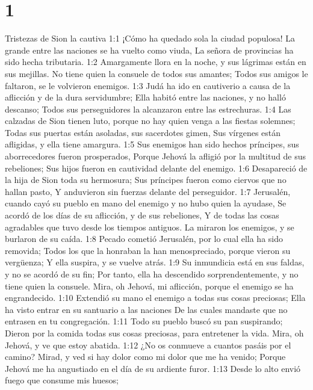 
\chapter{1}


Tristezas de Sion la cautiva  
1:1 ¡Cómo ha quedado sola la ciudad populosa!  
La grande entre las naciones se ha vuelto como viuda,  
La señora de provincias ha sido hecha tributaria.  
1:2 Amargamente llora en la noche, y sus lágrimas están en sus mejillas.  
No tiene quien la consuele de todos sus amantes;  
Todos sus amigos le faltaron, se le volvieron enemigos.  
1:3 Judá ha ido en cautiverio a causa de la aflicción y de la dura servidumbre;  
Ella habitó entre las naciones, y no halló descanso;  
Todos sus perseguidores la alcanzaron entre las estrechuras.  
1:4 Las calzadas de Sion tienen luto, porque no hay quien venga a las fiestas solemnes;  
Todas sus puertas están asoladas, sus sacerdotes gimen,  
Sus vírgenes están afligidas, y ella tiene amargura.  
1:5 Sus enemigos han sido hechos príncipes, sus aborrecedores fueron prosperados,  
Porque Jehová la afligió por la multitud de sus rebeliones;  
Sus hijos fueron en cautividad delante del enemigo.  
1:6 Desapareció de la hija de Sion toda su hermosura;  
Sus príncipes fueron como ciervos que no hallan pasto,  
Y anduvieron sin fuerzas delante del perseguidor.  
1:7 Jerusalén, cuando cayó su pueblo en mano del enemigo y no hubo quien la ayudase,  
Se acordó de los días de su aflicción, y de sus rebeliones,  
Y de todas las cosas agradables que tuvo desde los tiempos antiguos.  
La miraron los enemigos, y se burlaron de su caída.  
1:8 Pecado cometió Jerusalén, por lo cual ella ha sido removida;  
Todos los que la honraban la han menospreciado, porque vieron su vergüenza;  
Y ella suspira, y se vuelve atrás.  
1:9 Su inmundicia está en sus faldas, y no se acordó de su fin;  
Por tanto, ella ha descendido sorprendentemente, y no tiene quien la consuele.  
Mira, oh Jehová, mi aflicción, porque el enemigo se ha engrandecido.  
1:10 Extendió su mano el enemigo a todas sus cosas preciosas;  
Ella ha visto entrar en su santuario a las naciones  
De las cuales mandaste que no entrasen en tu congregación.  
1:11 Todo su pueblo buscó su pan suspirando;  
Dieron por la comida todas sus cosas preciosas, para entretener la vida.  
Mira, oh Jehová, y ve que estoy abatida.  
1:12 ¿No os conmueve a cuantos pasáis por el camino?  
Mirad, y ved si hay dolor como mi dolor que me ha venido;  
Porque Jehová me ha angustiado en el día de su ardiente furor.  
1:13 Desde lo alto envió fuego que consume mis huesos;  
